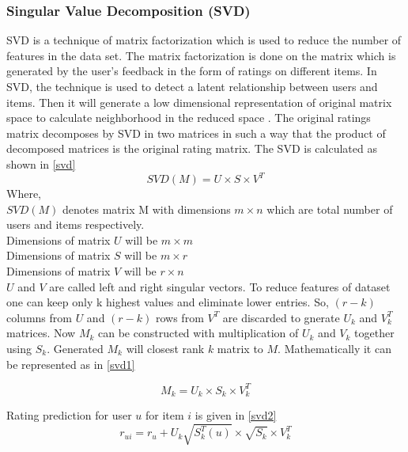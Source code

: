 \subsubsection{Singular Value Decomposition (SVD)}
\label{sec:svd}
SVD is a technique of matrix factorization which is used to reduce the number of features in the data set. The matrix factorization is done on the matrix which is generated by the user's feedback in the form of ratings on different items. In SVD, the technique is used to detect a latent relationship between users and items. Then it will generate a low dimensional representation of original matrix space to calculate neighborhood in the reduced space \cite{32}. The original ratings matrix decomposes by SVD in two matrices in such a way that the product of decomposed matrices is the original rating matrix. The SVD is calculated as shown in \autoref{svd}
\begin{equation}
SVD(M) = U \times S \times V^{T} 
\label{svd}
\end{equation}
\noindent Where,\\
$SVD(M)$ denotes matrix M with dimensions $m \times n$ which are total number of users and items respectively.\\
Dimensions of matrix $U$ will be $m \times m$ \\
Dimensions of matrix $S$ will be $m \times r$ \\
Dimensions of matrix $V$ will be $r \times n$ \\
$U$ and $V$ are called left and right singular vectors. To reduce features of dataset one can keep only k highest values and eliminate lower entries. So, $(r-k)$ columns from $U$ and $(r-k)$ rows from $V^{T}$ are discarded to gnerate $U_{k}$ and $V_{k}^{T}$ matrices. Now $M_{k}$ can be constructed with multiplication of $U_{k}$ and $V_{k}$ together using $S_{k}$. Generated $M_{k}$ will closest rank $k$ matrix to $M$. Mathematically it can be represented as in \autoref{svd1}

\begin{equation}
M_{k} = U_{k} \times S_{k} \times V_{k}^{T} 
\label{svd1}
\end{equation}

\noindent Rating prediction for user $u$ for item $i$ is given in \autoref{svd2} \\

\begin{equation}
r_{ui} = r_{u} + U_{k} \sqrt{S_{k}^{T} (u)} \times \sqrt{S_k} \times V_{k}^{T}
\label{svd2}
\end{equation}

